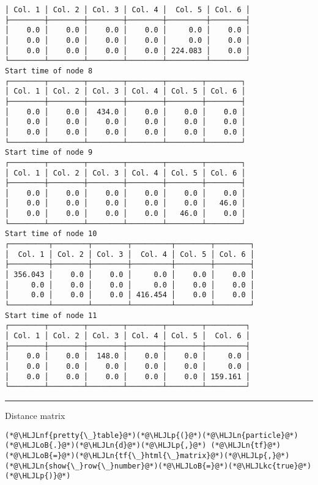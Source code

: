 \documentclass[12pt,a4paper]{article}
\newcommand{\HLJLkc}[1]{\textcolor[RGB]{59,151,46}{\textit{#1}}}
\newcommand{\HLJLn}[1]{#1}
\newcommand{\HLJLnf}[1]{\textcolor[RGB]{66,102,213}{#1}}
\newcommand{\HLJLoB}[1]{\textcolor[RGB]{102,102,102}{\textbf{#1}}}
\newcommand{\HLJLp}[1]{#1}
\begin{document}
\begin{lstlisting}
│ Col. 1 │ Col. 2 │ Col. 3 │ Col. 4 │  Col. 5 │ Col. 6 │
├────────┼────────┼────────┼────────┼─────────┼────────┤
│    0.0 │    0.0 │    0.0 │    0.0 │     0.0 │    0.0 │
│    0.0 │    0.0 │    0.0 │    0.0 │     0.0 │    0.0 │
│    0.0 │    0.0 │    0.0 │    0.0 │ 224.083 │    0.0 │
└────────┴────────┴────────┴────────┴─────────┴────────┘
Start time of node 8
┌────────┬────────┬────────┬────────┬────────┬────────┐
│ Col. 1 │ Col. 2 │ Col. 3 │ Col. 4 │ Col. 5 │ Col. 6 │
├────────┼────────┼────────┼────────┼────────┼────────┤
│    0.0 │    0.0 │  434.0 │    0.0 │    0.0 │    0.0 │
│    0.0 │    0.0 │    0.0 │    0.0 │    0.0 │    0.0 │
│    0.0 │    0.0 │    0.0 │    0.0 │    0.0 │    0.0 │
└────────┴────────┴────────┴────────┴────────┴────────┘
Start time of node 9
┌────────┬────────┬────────┬────────┬────────┬────────┐
│ Col. 1 │ Col. 2 │ Col. 3 │ Col. 4 │ Col. 5 │ Col. 6 │
├────────┼────────┼────────┼────────┼────────┼────────┤
│    0.0 │    0.0 │    0.0 │    0.0 │    0.0 │    0.0 │
│    0.0 │    0.0 │    0.0 │    0.0 │    0.0 │   46.0 │
│    0.0 │    0.0 │    0.0 │    0.0 │   46.0 │    0.0 │
└────────┴────────┴────────┴────────┴────────┴────────┘
Start time of node 10
┌─────────┬────────┬────────┬─────────┬────────┬────────┐
│  Col. 1 │ Col. 2 │ Col. 3 │  Col. 4 │ Col. 5 │ Col. 6 │
├─────────┼────────┼────────┼─────────┼────────┼────────┤
│ 356.043 │    0.0 │    0.0 │     0.0 │    0.0 │    0.0 │
│     0.0 │    0.0 │    0.0 │     0.0 │    0.0 │    0.0 │
│     0.0 │    0.0 │    0.0 │ 416.454 │    0.0 │    0.0 │
└─────────┴────────┴────────┴─────────┴────────┴────────┘
Start time of node 11
┌────────┬────────┬────────┬────────┬────────┬─────────┐
│ Col. 1 │ Col. 2 │ Col. 3 │ Col. 4 │ Col. 5 │  Col. 6 │
├────────┼────────┼────────┼────────┼────────┼─────────┤
│    0.0 │    0.0 │  148.0 │    0.0 │    0.0 │     0.0 │
│    0.0 │    0.0 │    0.0 │    0.0 │    0.0 │     0.0 │
│    0.0 │    0.0 │    0.0 │    0.0 │    0.0 │ 159.161 │
└────────┴────────┴────────┴────────┴────────┴─────────┘
\end{lstlisting}


\rule{\textwidth}{1pt}
Distance matrix


\begin{lstlisting}
(*@\HLJLnf{pretty{\_}table}@*)(*@\HLJLp{(}@*)(*@\HLJLn{particle}@*)(*@\HLJLoB{.}@*)(*@\HLJLn{d}@*)(*@\HLJLp{,}@*) (*@\HLJLn{tf}@*)(*@\HLJLoB{=}@*)(*@\HLJLn{tf{\_}html{\_}matrix}@*)(*@\HLJLp{,}@*) (*@\HLJLn{show{\_}row{\_}number}@*)(*@\HLJLoB{=}@*)(*@\HLJLkc{true}@*)(*@\HLJLp{)}@*)
\end{lstlisting}
\end{document}
